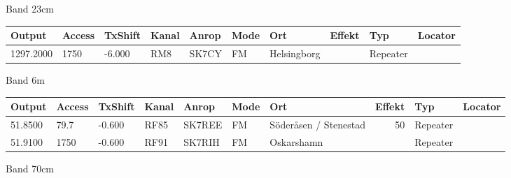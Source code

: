 \large{Band 23cm}
\begin{longtable}{lllllllrlr}
Output & Access & TxShift & Kanal & Anrop & Mode & Ort & Effekt & Typ & Locator \\ \hline
1297.2000&1750&-6.000&RM8&SK7CY&FM&Helsingborg&&Repeater&\\
\end{longtable}
\large{Band 6m}
\begin{longtable}{lllllllrlr}
Output & Access & TxShift & Kanal & Anrop & Mode & Ort & Effekt & Typ & Locator \\ \hline
51.8500&79.7&-0.600&RF85&SK7REE&FM&Söderåsen / Stenestad&50&Repeater&\\
51.9100&1750&-0.600&RF91&SK7RIH&FM&Oskarshamn&&Repeater&\\
\end{longtable}
\large{Band 70cm}

